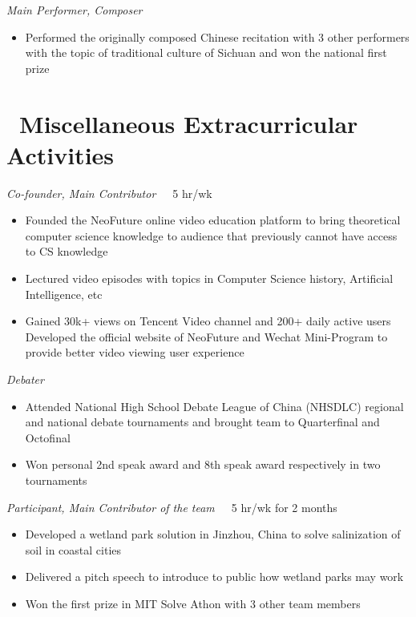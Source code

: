 \documentclass{resume}
\begin{document}
\emph{Main Performer, Composer}
\begin{itemize}
  \item Performed the originally composed Chinese recitation with 3 other performers with the topic of traditional culture of Sichuan and won the national first prize
\end{itemize}

\section{\faBlackTie\ Miscellaneous Extracurricular Activities}
\emph{Co-founder, Main Contributor}\ \ \ 5 hr/wk
\begin{itemize}
  \item Founded the NeoFuture online video education platform to bring theoretical computer science knowledge to audience that previously cannot have access to CS knowledge
  \item Lectured video episodes with topics in Computer Science history, Artificial Intelligence, etc
  \item Gained 30k+ views on Tencent Video channel and 200+ daily active users
  \iten Developed the official website of NeoFuture and Wechat Mini-Program to provide better video viewing user experience
\end{itemize}

\emph{Debater}
\begin{itemize}
  \item Attended National High School Debate League of China (NHSDLC) regional and national debate tournaments and brought team to Quarterfinal and Octofinal
  \item Won personal 2nd speak award and 8th speak award respectively in two tournaments
\end{itemize}

\emph{Participant, Main Contributor of the team}\ \ \ 5 hr/wk for 2 months
\begin{itemize}
  \item Developed a wetland park solution in Jinzhou, China to solve salinization of soil in coastal cities
  \item Delivered a pitch speech to introduce to public how wetland parks may work
  \item Won the first prize in MIT Solve Athon with 3 other team members
\end{itemize}
\end{document}
